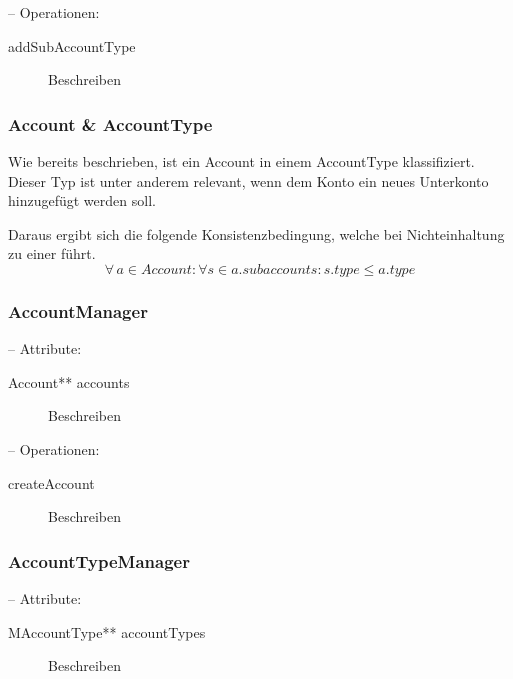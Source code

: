 -- Operationen:

\begin{description}
	\item[addSubAccountType] Beschreiben
\end{description}


\subsubsection{Account \& AccountType}
Wie bereits beschrieben, ist ein Account in einem AccountType klassifiziert. Dieser Typ ist unter anderem relevant, wenn dem Konto ein neues Unterkonto hinzugefügt werden soll.  




Daraus ergibt sich die folgende Konsistenzbedingung, welche bei Nichteinhaltung zu einer  führt.
\begin{equation} \forall \, a \in Account: \forall s \in a.subaccounts: s.type \leq a.type
\end{equation}




\subsubsection{AccountManager}


-- Attribute: 

\begin{description}
	\item[Account** accounts] Beschreiben
\end{description}

-- Operationen:

\begin{description}
	\item[createAccount] Beschreiben
\end{description}


\subsubsection{AccountTypeManager}


-- Attribute: 

\begin{description}
	\item[MAccountType** accountTypes] Beschreiben
\end{description}

